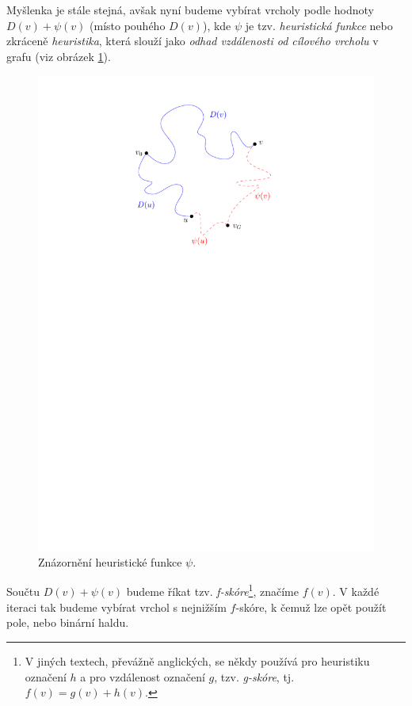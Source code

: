 Myšlenka je stále stejná, avšak nyní budeme vybírat vrcholy podle hodnoty $D(v)+\psi(v)$ (místo pouhého $D(v)$), kde $\psi$ je tzv. \emph{heuristická funkce} nebo zkráceně \emph{heuristika}, která slouží jako \emph{odhad vzdálenosti od cílového vrcholu} v grafu (viz obrázek \ref{fig:astar_heuristika}).
\begin{figure}[h]
    \centering
    \includegraphics[scale=\graphimgsize]{components/images/ch01_astar_heuristika.pdf}
    \caption{Znázornění heuristické funkce $\psi$.}
    \label{fig:astar_heuristika}
\end{figure}
Součtu $D(v)+\psi(v)$ budeme říkat tzv. \emph{f-skóre}\footnote{V jiných textech, převážně anglických, se někdy používá pro heuristiku označení $h$ a pro vzdálenost označení $g$, tzv. \emph{g-skóre}, tj. $f(v)=g(v)+h(v)$.}, značíme $f(v)$. V každé iteraci tak budeme vybírat vrchol s nejnižším $f$-skóre, k čemuž lze opět použít pole, nebo binární haldu.

